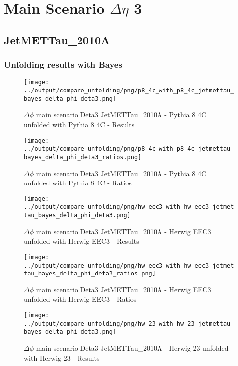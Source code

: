 \documentclass[11pt]{book}
\begin{document}
\newpage
\chapter{Main Scenario $\Delta\eta$ 3 }
\section{JetMETTau\_2010A}
\subsection{Unfolding results with Bayes}


\begin{figure}[ht]
\centering
\texttt{[image: ../output/compare\_unfolding/png/p8\_4c\_with\_p8\_4c\_jetmettau\_bayes\_delta\_phi\_deta3.png]}
\caption{$\Delta\phi$ main scenario Deta3 JetMETTau\_2010A - Pythia 8 4C unfolded with Pythia 8 4C - Results}
\label{p8_p8_jetmettau_bayes_delta_phi_deta3_a}
\end{figure}

\begin{figure}[ht]
\centering
\texttt{[image: ../output/compare\_unfolding/png/p8\_4c\_with\_p8\_4c\_jetmettau\_bayes\_delta\_phi\_deta3\_ratios.png]}
\caption{$\Delta\phi$ main scenario Deta3 JetMETTau\_2010A - Pythia 8 4C unfolded with Pythia 8 4C - Ratios}
\label{p8_p8_jetmettau_bayes_delta_phi_deta3_b}
\end{figure}

\begin{figure}[ht]
\centering
\texttt{[image: ../output/compare\_unfolding/png/hw\_eec3\_with\_hw\_eec3\_jetmettau\_bayes\_delta\_phi\_deta3.png]}
\caption{$\Delta\phi$ main scenario Deta3 JetMETTau\_2010A - Herwig EEC3 unfolded with Herwig EEC3 - Results}
\label{hw_eec3_hw_eec3_jetmettau_bayes_delta_phi_deta3_a}
\end{figure}

\begin{figure}[ht]
\centering
\texttt{[image: ../output/compare\_unfolding/png/hw\_eec3\_with\_hw\_eec3\_jetmettau\_bayes\_delta\_phi\_deta3\_ratios.png]}
\caption{$\Delta\phi$ main scenario Deta3 JetMETTau\_2010A - Herwig EEC3 unfolded with Herwig EEC3 - Ratios}
\label{hw_eec3_hw_eec3_jetmettau_bayes_delta_phi_deta3_b}
\end{figure}

\begin{figure}[ht]
\centering
\texttt{[image: ../output/compare\_unfolding/png/hw\_23\_with\_hw\_23\_jetmettau\_bayes\_delta\_phi\_deta3.png]}
\caption{$\Delta\phi$ main scenario Deta3 JetMETTau\_2010A - Herwig 23 unfolded with Herwig 23 - Results}
\label{hw_23_hw_23_jetmettau_bayes_delta_phi_deta3_a}
\end{figure}
\end{document}
